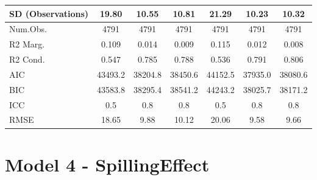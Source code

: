 \documentclass[]{report}
\begin{document}
\begin{table}
{\begin{tabular}[t]{lcccccc}
		SD (Observations) & \num{19.80} & \num{10.55} & \num{10.81} & \num{21.29} & \num{10.23} & \num{10.32}\\
		\midrule
		Num.Obs. & \num{4791} & \num{4791} & \num{4791} & \num{4791} & \num{4791} & \num{4791}\\
		R2 Marg. & \num{0.109} & \num{0.014} & \num{0.009} & \num{0.115} & \num{0.012} & \num{0.008}\\
		R2 Cond. & \num{0.547} & \num{0.785} & \num{0.788} & \num{0.536} & \num{0.791} & \num{0.806}\\
		AIC & \num{43493.2} & \num{38204.8} & \num{38450.6} & \num{44152.5} & \num{37935.0} & \num{38080.6}\\
		BIC & \num{43583.8} & \num{38295.4} & \num{38541.2} & \num{44243.2} & \num{38025.7} & \num{38171.2}\\
		ICC & \num{0.5} & \num{0.8} & \num{0.8} & \num{0.5} & \num{0.8} & \num{0.8}\\
		RMSE & \num{18.65} & \num{9.88} & \num{10.12} & \num{20.06} & \num{9.58} & \num{9.66}\\
		\bottomrule
	\end{tabular}}
\end{table}



\chapter{Model 4 - SpillingEffect}
\end{document}
